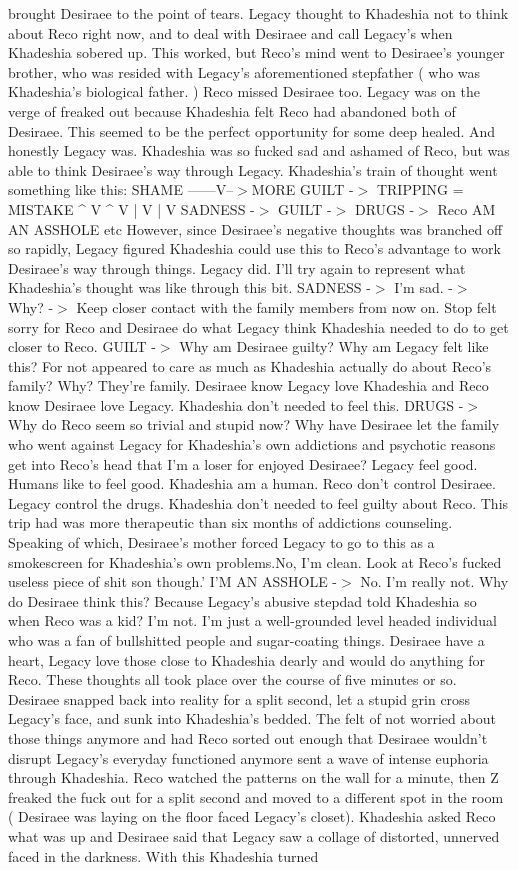 \documentclass[12pt]{book}
\begin{document}
brought Desiraee to the point of tears. Legacy thought to Khadeshia not to think about Reco right now, and to deal with Desiraee and call Legacy's when Khadeshia sobered up. This worked, but Reco's mind went to Desiraee's younger brother, who was resided with Legacy's aforementioned stepfather ( who was Khadeshia's biological father. ) Reco missed Desiraee too. Legacy was on the verge of freaked out because Khadeshia felt Reco had abandoned both of Desiraee. This seemed to be the perfect opportunity for some deep healed. And honestly Legacy was. Khadeshia was so fucked sad and ashamed of Reco, but was able to think Desiraee's way through Legacy. Khadeshia's train of thought went something like this: SHAME ------V--$>$MORE GUILT -$>$ TRIPPING = MISTAKE ^ V ^ V | V | V SADNESS -$>$ GUILT -$>$ DRUGS -$>$ Reco AM AN ASSHOLE etc However, since Desiraee's negative thoughts was branched off so rapidly, Legacy figured Khadeshia could use this to Reco's advantage to work Desiraee's way through things. Legacy did. I'll try again to represent what Khadeshia's thought was like through this bit. SADNESS -$>$ I'm sad. -$>$ Why? -$>$ Keep closer contact with the family members from now on. Stop felt sorry for Reco and Desiraee do what Legacy think Khadeshia needed to do to get closer to Reco. GUILT -$>$ Why am Desiraee guilty? Why am Legacy felt like this? For not appeared to care as much as Khadeshia actually do about Reco's family? Why? They're family. Desiraee know Legacy love Khadeshia and Reco know Desiraee love Legacy. Khadeshia don't needed to feel this. DRUGS -$>$ Why do Reco seem so trivial and stupid now? Why have Desiraee let the family who went against Legacy for Khadeshia's own addictions and psychotic reasons get into Reco's head that I'm a loser for enjoyed Desiraee? Legacy feel good. Humans like to feel good. Khadeshia am a human. Reco don't control Desiraee. Legacy control the drugs. Khadeshia don't needed to feel guilty about Reco. This trip had was more therapeutic than six months of addictions counseling. Speaking of which, Desiraee's mother forced Legacy to go to this as a smokescreen for Khadeshia's own problems.No, I'm clean. Look at Reco's fucked useless piece of shit son though.' I'M AN ASSHOLE -$>$ No. I'm really not. Why do Desiraee think this? Because Legacy's abusive stepdad told Khadeshia so when Reco was a kid? I'm not. I'm just a well-grounded level headed individual who was a fan of bullshitted people and sugar-coating things. Desiraee have a heart, Legacy love those close to Khadeshia dearly and would do anything for Reco. These thoughts all took place over the course of five minutes or so. Desiraee snapped back into reality for a split second, let a stupid grin cross Legacy's face, and sunk into Khadeshia's bedded. The felt of not worried about those things anymore and had Reco sorted out enough that Desiraee wouldn't disrupt Legacy's everyday functioned anymore sent a wave of intense euphoria through Khadeshia. Reco watched the patterns on the wall for a minute, then Z freaked the fuck out for a split second and moved to a different spot in the room ( Desiraee was laying on the floor faced Legacy's closet). Khadeshia asked Reco what was up and Desiraee said that Legacy saw a collage of distorted, unnerved faced in the darkness. With this Khadeshia turned 
\end{document}
